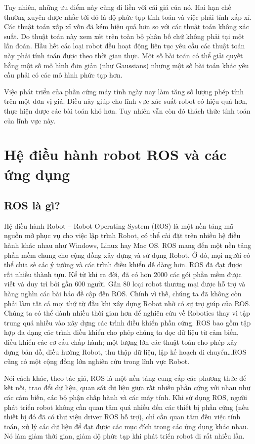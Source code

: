 {Tuy nhiên, những ưu điểm này cũng đi liền với cái giá của nó. Hai hạn chế thường xuyên được nhắc tới đó là độ phức tạp tính toán và việc phải tính xấp xỉ. Các thuật toán xấp xỉ vốn đã kém hiệu quả hơn so với các thuật toán không xác suất. Do thuật toán này xem xét trên toàn bộ phân bố chứ không phải tại một lần đoán. Hầu hết các loại robot đều hoạt động liên tục yêu cầu các thuật toán này phải tính toán được theo thời gian thực. Một số bài toán có thể giải quyết bằng một số mô hình đơn giản (như Gaussians) nhưng một số bài toán khác yêu cầu phải có các mô hình phức tạp hơn.

Việc phát triển của phần cứng máy tính ngày nay làm tăng số lượng phép tính trên một đơn vị giá. Điều này giúp cho lĩnh vực xác suất robot có hiệu quả hơn, thực hiện được các bài toán khó hơn. Tuy nhiên vẫn còn đó thách thức tính toán của lĩnh vực này. \cite{thrun2005probabilistic}


\section{Hệ điều hành robot ROS và các ứng dụng}
\subsection{ROS là gì?}
Hệ điều hành Robot – Robot Operating System (ROS) là một nền tảng mã nguồn
mở phục vụ cho việc lập trình Robot, có thể cài đặt trên nhiều hệ điều hành khác
nhau như Windows, Linux hay Mac OS. ROS mang đến một nền tảng phần mềm
chung cho cộng đồng xây dựng và sử dụng Robot. Ở đó, mọi người có thể chia sẻ
các ý tưởng và các trình điều khiển dễ dàng hơn.
ROS đã đạt được rất nhiều thành tựu. Kể từ khi ra đời, đã có hơn 2000 các gói
phần mềm được viết và duy trì bởi gần 600 người. Gần 80 loại robot thương mại
được hỗ trợ và hàng nghìn các bài báo đề cập đến ROS. Chính vì thế, chúng ta đã
không còn phải làm tất cả mọi thứ từ đầu khi xây dựng Robot nhờ có sự trợ giúp
của ROS. Chúng ta có thể dành nhiều thời gian hơn để nghiên cứu về Robotics
thay vì tập trung quá nhiều vào xây dựng các trình điều khiển phần cứng.
ROS bao gồm tập hợp đa dạng các trình điều khiển cho phép chúng ta đọc dữ
liệu từ cảm biến, điều khiển các cơ cấu chấp hành; một lượng lớn các thuật toán
cho phép xây dựng bản đồ, điều hướng Robot, thu thập dữ liệu, lập kế hoạch di
chuyển\dots ROS cũng có một cộng đồng lớn nghiên cứu trong lĩnh vực Robot.

Nói cách khác, theo tác giả, ROS là một nền tảng cung cấp các phương thức để kết nối, trao đổi dữ liệu, quan sát dữ liệu giữa rất nhiều phần cứng với nhau như các cảm biến, các bộ phận chấp hành và các máy tính. Khi sử dụng ROS, người phát triển robot không cần quan tâm quá nhiều đến các thiết bị phần cứng (nếu thiết bị đó đã có thư viện driver ROS hỗ trợ), chỉ cần quan tâm đến việc tính toán, xử lý các dữ liệu để đạt được các mục đích trong các ứng dụng khác nhau. Nó làm giảm thời gian, giảm độ phức tạp khi phát triển robot đi rất nhiều lần.

}
